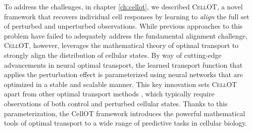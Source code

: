 To address the challenges, in chapter \ref{ch:cellot}, we described \textsc{CellOT}, a novel framework that recovers individual cell responses by learning to \emph{align} the full set of perturbed and unperturbed observations. 
While previous approaches to this problem have failed to adequately address the fundamental alignment challenge,
\textsc{CellOT}, however, leverages the mathematical theory of optimal transport to strongly align the distribution of cellular states.
By way of cutting-edge advancements in neural optimal transport, the learned transport function that applies the perturbation effect is parameterized using neural networks that are optimized in a stable and scalable manner.
This key innovation sets \textsc{CellOT} apart from other optimal transport methods \cite{schiebinger2019}, which typically require observations of both control and perturbed cellular states.
Thanks to this parameterization, the CellOT framework introduces the powerful mathematical tools of optimal transport to a wide range of predictive tasks in cellular biology.



